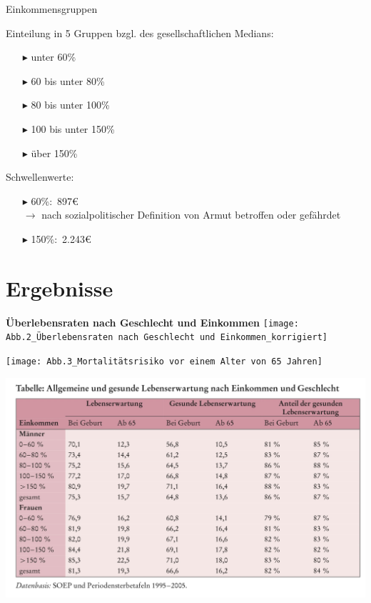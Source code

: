 \documentclass{beamer}
\begin{document}
\begin{frame}{Einkommensgruppen}
	\begin{block}{Einteilung in 5 Gruppen bzgl. des gesellschaftlichen Medians:}
		\begin{itemize}
			\item[$\blacktriangleright$] unter 60\%
			\item[$\blacktriangleright$] 60 bis unter 80\%
			\item[$\blacktriangleright$] 80 bis unter 100\%
			\item[$\blacktriangleright$] 100 bis unter 150\%
			\item[$\blacktriangleright$] über 150\%
		\end{itemize}
	\end{block}
	\begin{block}{Schwellenwerte:}
		\begin{itemize}
			\item[$\blacktriangleright$] 60\%:\, 897€ \\ $\rightarrow$ nach sozialpolitischer Definition von Armut betroffen oder gefährdet
			\item[$\blacktriangleright$] 150\%:\, 2.243€
		\end{itemize}
	\end{block}
\end{frame}



\section{Ergebnisse}
\begin{frame}
\textbf{Überlebensraten nach Geschlecht und Einkommen}
	\texttt{[image: Abb.2\_Überlebensraten nach Geschlecht und Einkommen\_korrigiert]}
\end{frame}

\begin{frame}
	\texttt{[image: Abb.3\_Mortalitätsrisiko vor einem Alter von 65 Jahren]}
\end{frame}

\begin{frame}
	\includegraphics[scale=0.18]{Tabelle_allgemeine und gesunde Lebenserwartung}
\end{frame}
\end{document}
